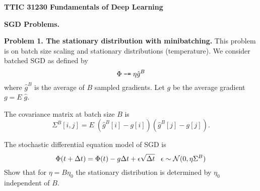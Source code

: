 \documentclass{article}
\newcommand{\solution}[1]{}
\begin{document}
\centerline{\bf TTIC 31230 Fundamentals of Deep Learning}
\bigskip
\centerline{\bf SGD Problems.}

{\bf Problem 1. The stationary distribution with minibatching.} This problem is on batch size scaling and stationary distributions (temperature).  We consider batched SGD as defined by
$$\Phi \;\mbox{\tt -=} \; \eta \hat{g}^B$$
where $\hat{g}^B$ is the average of $B$ sampled gradients.  Let $g$ be the average gradient $g = E\;\hat{g}$.

\medskip The covariance matrix at batch size $B$ is
$$\Sigma^B[i,j] = E\;(\hat{g}^B[i] - g[i])(\hat{g}^B[j] - g[j]).$$

\medskip The stochastic differential equation model of SGD is
$$\Phi(t + \Delta t) = \Phi(t) - g\Delta t + \epsilon \sqrt{\Delta t}\;\;\;\epsilon \sim {\cal N}(0,\eta\Sigma^B)$$
Show that for $\eta = B\eta_0$ the stationary distribution is determined by $\eta_0$ independent of $B$.

\solution{
  \begin{eqnarray*}
    \Sigma^B[i,j] & = & E\;(\hat{g}^B[i] - g[i])(\hat{g}^B[j] - g[j]) \\
    \\
    & = & \frac{1}{B^2} E \left(\sum_b \hat{g}_b[i] - g[i] \right)\left(\sum_b \hat{g}_b[j] - g[j]\right) \\
    \\
    & = & \frac{1}{B^2} E \sum_{b,b'}\left(\hat{g}_b[i] - g[i] \right)\left(\hat{g}_{b'}[j] - g[j]\right) \\
    \\
    & = & \frac{1}{B^2} \sum_{b}\;E\;\left(\hat{g}_b[i] - g[i] \right)\left(\hat{g}_{b}[j] - g[j]\right)
    + \sum_{b,b'\not = b}\;E\;\left(\hat{g}_b[i] - g[i] \right)\left(\hat{g}_{b'}[j] - g[j]\right) \\
    \\
    & = & \frac{1}{B^2} \sum_{b}\;E\;\left(\hat{g}_b[i] - g[i] \right)\left(\hat{g}_{b}[j] - g[j]\right)
    + \sum_{b,b'\not = b}\;\left(E\;\hat{g}_b[i] - g[i] \right)\left(E\; \hat{g}_{b'}[j] - g[j]\right) \\
    \\
    & = & \frac{1}{B^2} \sum_{b}\;E\;\left(\hat{g}_b[i] - g[i] \right)\left(\hat{g}_{b}[j] - g[j]\right) \\
    \\
    & = & \frac{1}{B} \Sigma^1[i,j]
  \end{eqnarray*}

  So for $\eta = B\eta_0$ we have $\eta\Sigma^B  = \eta_0\Sigma^1$ which yields the equivalence.
}
\end{document}
